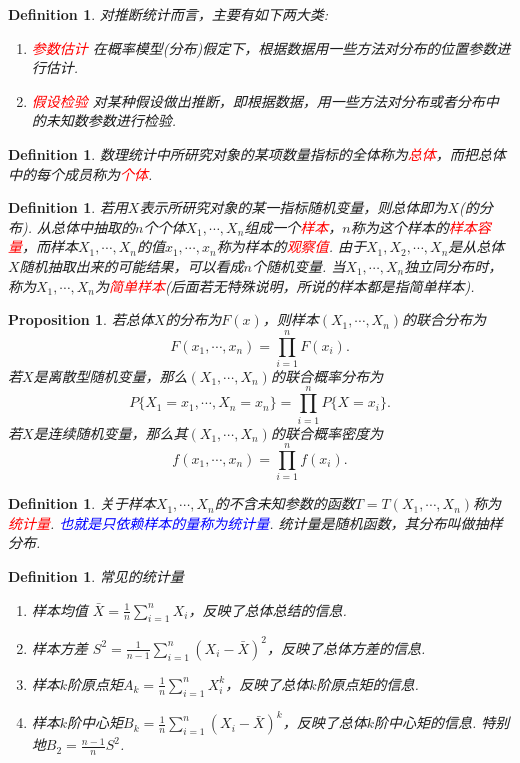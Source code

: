 \documentclass{article}
\newtheorem{proposition}[theorem]{Proposition}
\newtheorem{definition}[theorem]{Definition}
\newcommand{\redt}[1]{\textcolor{red}{#1}}
\newcommand{\bluet}[1]{\textcolor{blue}{#1}}
\begin{document}
\begin{definition}
\rm 对推断统计而言，主要有如下两大类:
\begin{enumerate}
	\item \redt{参数估计} 在概率模型(分布)假定下，根据数据用一些方法对分布的位置参数进行估计. 
	\item \redt{假设检验} 对某种假设做出推断，即根据数据，用一些方法对分布或者分布中的未知数参数进行检验. 
\end{enumerate}
\end{definition}

\begin{definition}
\rm 数理统计中所研究对象的某项数量指标的全体称为\redt{总体}，而把总体中的每个成员称为\redt{个体}.
\end{definition}

\begin{definition}
\rm 若用$X$表示所研究对象的某一指标随机变量，则总体即为$X$(的分布). 从总体中抽取的$n$个个体$X_1,\cdots,X_n$组成一个\redt{样本}，$n$称为这个样本的\redt{样本容量}，而样本$X_1,\cdots,X_n$的值$x_1,\cdots,x_n$称为样本的\redt{观察值}. 由于$X_1,X_2,\cdots,X_n$是从总体$X$随机抽取出来的可能结果，可以看成$n$个随机变量. 当$X_1,\cdots,X_n$独立同分布时，称为$X_1,\cdots,X_n$为\redt{简单样本}(后面若无特殊说明，所说的样本都是指简单样本).
\end{definition}

\begin{proposition}
\rm 若总体$X$的分布为$F(x)$，则样本$(X_1,\cdots,X_n)$的联合分布为
$$
F(x_1,\cdots,x_n) = \prod\limits_{i=1}^n F(x_i).
$$
若$X$是离散型随机变量，那么$(X_1,\cdots,X_n)$的联合概率分布为
$$
P\{X_1 = x_1 ,\cdots , X_n = x_n\} = \prod\limits_{i=1}^n P\{X=x_i\}.
$$
若$X$是连续随机变量，那么其$(X_1,\cdots,X_n)$的联合概率密度为
$$
f(x_1,\cdots,x_n) = \prod\limits_{i=1}^n f(x_i).
$$
\end{proposition}

\begin{definition}
\rm 关于样本$X_1,\cdots,X_n$的不含未知参数的函数$T=T(X_1,\cdots,X_n)$称为\redt{统计量}. \bluet{也就是只依赖样本的量称为统计量}. 统计量是随机函数，其分布叫做抽样分布. 
\end{definition}

\begin{definition}
\rm 常见的统计量
\begin{enumerate}
	\item 样本均值 $\bar{X} = \frac{1}{n}\sum\limits_{i=1}^n X_i$，反映了总体总结的信息. 
	\item 样本方差 $S^2 = \frac{1}{n-1}\sum\limits_{i=1}^n(X_i-\bar{X})^2$，反映了总体方差的信息.
	\item 样本$k$阶原点矩$A_k = \frac{1}{n}\sum\limits_{i=1}^n X_i^k$，反映了总体$k$阶原点矩的信息.
	\item 样本$k$阶中心矩$B_k = \frac{1}{n}\sum\limits_{i=1}^n (X_i-\bar{X})^k$，反映了总体$k$阶中心矩的信息. 特别地$B_2 = \frac{n-1}{n}S^2$.
\end{enumerate}
\end{definition}
\end{document}

